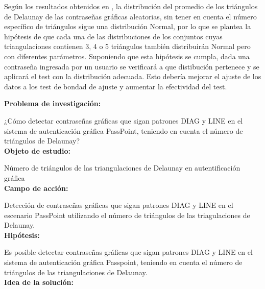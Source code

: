 \documentclass[12pt]{report}
\begin{document}
	
	Según los resultados obtenidos en \cite{13}, la distribución del promedio de los triángulos de  Delaunay de las contraseñas gráficas aleatorias, sin tener en cuenta el número específico de triángulos sigue una distribución Normal, por lo que se plantea la hipótesis de que cada una de las distribuciones de los conjuntos cuyas triangulaciones contienen 3, 4 o 5 triángulos también distribuirán Normal pero con diferentes parámetros. Suponiendo que esta hipótesis se cumpla, dada una contraseña ingresada por un usuario se verificará a que distibución pertenece y se aplicará el test con la distribución adecuada. Esto debería mejorar el ajuste de los datos a los test de bondad de ajuste y aumentar la efectividad del test.
	
	\large{\textbf{Problema de investigación:}}
	
	\normalsize{¿Cómo  detectar contraseñas gráficas que sigan patrones DIAG y LINE  en el sistema de autenticación gráfica PassPoint, teniendo en cuenta el número de triángulos de Delaunay?}\\
	
	\large{\textbf{Objeto de estudio:}}
	
	\normalsize{Número de triángulos de las  triangulaciones de Delaunay  en autentificación gráfica}\\
	
		   
	\large{\textbf{Campo de acción:}}
	
	\normalsize{Detección de contraseñas gráficas que sigan patrones DIAG y LINE en el escenario PassPoint   utilizando  el número de triángulos de las triagulaciones de Delaunay}.\\
	 
	\large{\textbf{Hipótesis:}}

	\normalsize{Es posible detectar contraseñas gráficas que sigan patrones DIAG y LINE en el sistema de autenticación gráfica Passpoint, teniendo en cuenta el número de triángulos  de las triangulaciones de Delaunay}.\\
		
	
	\large{\textbf{Idea de la solución:}}
	
\end{document}
